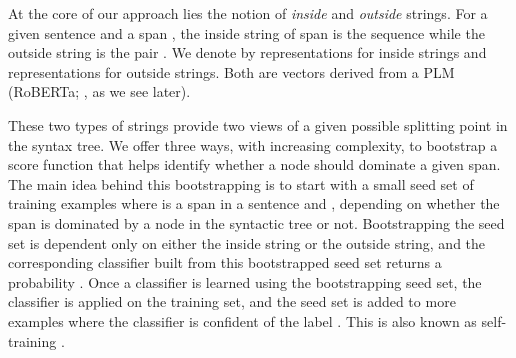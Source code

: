 \documentclass[11pt]{article}
\newcommand{\ignore}[1]{}
\begin{document}
At the core of our approach lies the notion of \emph{inside} and \emph{outside} strings. For a given sentence  and a span , the inside string of span  is the sequence  while the outside string is the pair . We denote by  representations for inside strings and  representations for outside strings. Both are vectors derived from a PLM (RoBERTa; \citealt{DBLP:journals/corr/abs-1907-11692}, as we see later).





These two types of strings provide two views of a given possible splitting point in the syntax tree. We offer three ways, with increasing complexity, to bootstrap a score function that helps identify whether a node should dominate a given span.
The main idea behind this bootstrapping is to start with a small seed set of training examples  where  is a span in a sentence  and , depending on whether the span  is dominated by a node in the syntactic tree or not.
Bootstrapping the seed set is dependent only on either the inside string or the outside string, and the corresponding classifier built from this bootstrapped seed set returns a probability . Once a classifier is learned using the bootstrapping seed set, the classifier is applied on the training set, and the seed set is added to more examples where the classifier is confident of the label . This is also known as self-training \citep{mcclosky-etal-2006-effective, mcclosky-etal-2008-self}.

\ignore{
\begin{figure}[t]
\begin{footnotesize}
\framebox{\parbox{\columnwidth}{

{\bf Inputs:} Input strings , an inside seed function  and an outside seed function .


{\bf Algorithm:} (calculate all inside and outside strings)

\begin{itemize}

\item For all  such that ,

\end{itemize}

{\bf Return:}

}}
\end{footnotesize}
\caption{\small The tensor form for calculation of .}
\label{fig:dpobservable}
\vspace{-2ex}
\end{figure}
}
\end{document}

